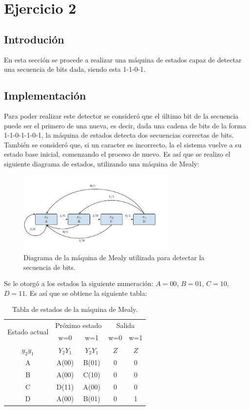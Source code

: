 
\usepackage{multirow}


\section{Ejercicio 2}
\subsection{Introdución}
En esta sección se procede a realizar una máquina de estados capaz de detectar una secuencia de bits dada, siendo esta 1-1-0-1.

\subsection{Implementación} 
Para poder realizar este detector se consideró que el último bit de la secuencia puede ser el primero de una nueva, es decir, dada una cadena de bits de la forma 1-1-0-1-1-0-1, la máquina de estados detecta dos secuencias correctas de bits. También se consideró que, si un caracter es incorrecto, la el sistema vuelve a su estado base inicial, comenzando el proceso de nuevo. Es así que se realizo el siguiente diagrama de estados, utilizando una máquina de Mealy:
\begin{figure}[H]
\centering
	\includegraphics[width=0.7\textwidth, page = 1]{ImagenesEjercicio2/FSM2.pdf}
	\caption{Diagrama de la máquina de Mealy utilizada para detectar la secuencia de bits.}
\end{figure}

Se le otorgó a los estados la siguiente numeración: $A=00$, $B=01$, $C=10$, $D=11$. Es así que se obtiene la siguiente tabla:
\begin{table}[H]
\centering
\begin{tabular}{ccccc}
\hline
\multirow{2}{*}{Estado actual} & \multicolumn{2}{c}{Próximo estado} & \multicolumn{2}{c}{Salida} \\
 & w=0 & w=1 & w=0 & w=1 \\
\hline
$y_2y_1$ & $Y_2Y_1$ & $Y_2Y_1$ & $Z$ & $Z$ \\
A & A(00) & B(01) & 0 & 0 \\
B & A(00) & C(10) & 0 & 0 \\
C & D(11) & A(00) & 0 & 0 \\
D & A(00) & B(01) & 0 & 1 \\
\hline
\end{tabular}
\caption{Tabla de estados de la máquina de Mealy.}
\label{tab:estadosmealy}
\end{table}

